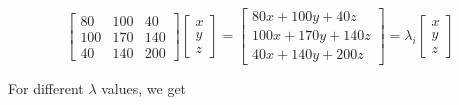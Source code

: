 \begin{equation}
    \begin{bmatrix}
        80 & 100 & 40 \\
        100 & 170 & 140 \\
        40 & 140 & 200
        \end{bmatrix} \begin{bmatrix}
        x \\ y \\ z
        \end{bmatrix} = \begin{bmatrix}
            80 x + 100 y + 40 z \\
            100 x + 170 y + 140 z \\
            40 x + 140 y + 200 z
            \end{bmatrix} = \lambda_i \begin{bmatrix}
        x \\ y \\ z
        \end{bmatrix}
\end{equation}

For different $\lambda$ values, we get


